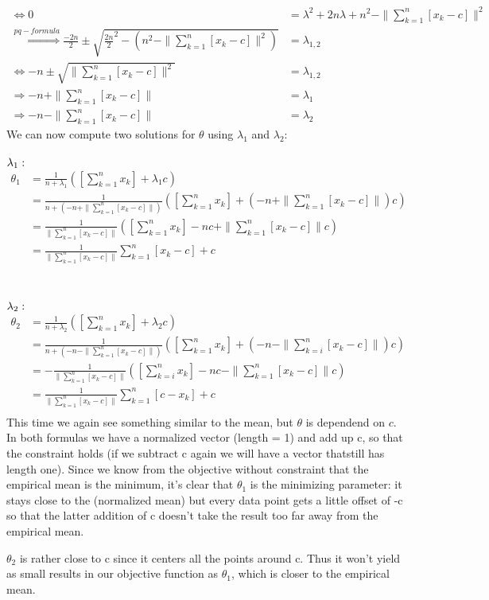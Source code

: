 \documentclass[10pt,a4paper]{article}
\begin{document}
\begin{enumerate}[(a)]
\begin{align*}
    \Leftrightarrow 0 &= \lambda^2 + 2n\lambda + n^2 - \|\sum_{k = 1}^{n}[x_k - c]\|^2 \\
    \overset{pq-formula}{\Rightarrow } \frac{-2n}{2} \pm \sqrt{\frac{2n}{2}^2-(n^2 - \|\sum_{k = 1}^{n}[x_k - c]\|^2)} &= \lambda_{1,2}\\
    \Leftrightarrow -n \pm \sqrt{\|\sum_{k = 1}^{n}[x_k - c]\|^2} &= \lambda_{1,2}\\
    \Rightarrow -n + \|\sum_{k = 1}^{n}[x_k - c]\| &= \lambda_1\\
    \Rightarrow-n -  \|\sum_{k = 1}^{n}[x_k - c]\| &= \lambda_2
\end{align*}
We can now compute two solutions for $\theta$ using $\lambda_1$ and $\lambda_2$:\\ \\
$\lambda_1:\\$
\begin{align*}
	\theta_1 &= \frac{1}{n+\lambda_1} ([\sum_{k = 1}^{n}x_k] + \lambda_1 c)\\
	&=  \frac{1}{n+( -n + \|\sum_{k = 1}^{n}[x_k - c]\|)} ([\sum_{k = 1}^{n}x_k] +( -n + \|\sum_{k = 1}^{n}[x_k - c]\|) c)\\
	&= \frac{1}{\|\sum_{k = 1}^{n}[x_k - c]\|}  ([\sum_{k = 1}^{n}x_k] -nc + \|\sum_{k = 1}^{n}[x_k - c]\| c)\\
	&=  \frac{1}{\|\sum_{k = 1}^{n}[x_k - c]\|} \sum_{k = 1}^{n}[x_k-c] + c\\
\end{align*}\\ \\
$\lambda_2:\\$
\begin{align*}
	\theta_2 &= \frac{1}{n+\lambda_2} ([\sum_{k = 1}^{n}x_k] + \lambda_2 c)\\
	&=  \frac{1}{n+( -n - \|\sum_{k = 1}^{n}[x_k - c]\|)} ([\sum_{k = 1}^{n}x_k] +( -n - \|\sum_{k = i}^{n}[x_k - c]\|) c)\\
	&= -\frac{1}{\|\sum_{k = 1}^{n}[x_k - c]\|}  ([\sum_{k = i}^{n}x_k] -nc - \|\sum_{k = 1}^{n}[x_k - c]\| c)\\
	&=  \frac{1}{\|\sum_{k = 1}^{n}[x_k - c]\|} \sum_{k = 1}^{n}[c-x_k] + c\\
\end{align*}
This time we again see something similar to the mean, but $\theta$ is dependend on $c$. In both formulas we have a normalized vector (length = 1) and add up c, so that the constraint holds (if we subtract c again we will have a vector thatstill has length one). Since we know from the objective without constraint that the empirical mean is the minimum, it's clear that $\theta_1$ is the minimizing parameter: it stays close to the (normalized mean) but every data point gets a little offset of -c so that the latter addition of c doesn't take the result too far away from the empirical mean.

$\theta_2$ is rather close to c since it centers all the points around c. Thus it won't yield as small results in our objective function as $\theta_1$, which is closer to the empirical mean.

\end{enumerate}
\end{document}
